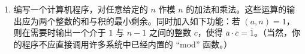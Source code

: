 \begin{enumerate}[label=\arabic*.]
  \begin{enumerate}[label=(\alph*)]
    \item $a=13,\ n=20$。
    \item $a=69,\ n=89$。
    \item $a=1891,\ n=3797$。
    \item $a=6003722857,\ n=77695236973$。[对这两个整数，欧几里得算法只需要 $3$ 步。]
  \end{enumerate}
  \item 编写一个计算机程序，对任意给定的 $n$ 作模 $n$ 的加法和乘法。这些运算的输出应为两个整数的和与积的最小剩余。同时加入如下功能：若 $(a,n)=1$，则在需要时输出一个介于 $1$ 与 $n-1$ 之间的整数 $c$，使得 $\overline{a}\cdot\overline{c}=\overline{1}$。（当然，你的程序不应直接调用许多系统中已经内置的 ``mod'' 函数。）
\end{enumerate}
